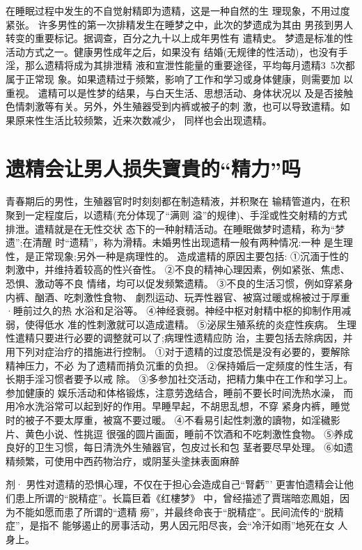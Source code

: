 \documentclass[12pt,UTF8]{ctexbook}
\begin{document}
在睡眠过程中发生的不自觉射精即为遗精，这是一种自然的生
理现象，不用过度紧张。
许多男性的第一次排精发生在睡梦之中，此次的梦遗成为其由
男孩到男人转变的重要标记。据调查，百分之九十以上成年男性有
遣精史。
梦遗是标准的性活动方式之一。健康男性成年之后，如果没有
结婚(无规律的性活动)，也没有手淫，那么遗精将成为其排泄精
液和宣泄性能量的重要途径，平均每月遗精3~5次都属于正常现
象。如果遗精过于频繁，影响了工作和学习或身体健康，则需要加
以重视。
遣精可以是性梦的结果，与白天生活、思想活动、身体状况以
及是否接触色情刺激等有关。另外，外生殖器受到内裤或被子的刺
激，也可以导致遣精。如果原来性生活比较频繁，近来次数减少，
同样也会出现遗精。

\section{遗精会让男人损失寶貴的“精力”吗}

青春期后的男性，生殖器官时时刻刻都在制造精液，并积聚在
输精管道内，在积聚到一定程度后，以遗精(充分体现了“满则
溢”的规律)、手淫或性交射精的方式排泄。遣精就是在无性交状
态下的一种射精活动。在睡眠做梦时遗精，称为“梦遗”;在清醒
时“遗精”，称为滑精。未婚男性出现遗精一般有两种情况:一种
是生理性，是正常现象;另外一种是病理性的。
造成遣精的原因主要包括:
①沉湎于性的刺激中，并维持着较高的性兴奋性。
②不良的精神心理因素，例如紧张、焦虑、恐惧、激动等不良
情绪，均可以促发频繁遗精。
③不良的生活习惯，例如穿紧身内裤、酗酒、吃刺激性食物、
劇烈运动、玩弄性器官、被窩过暖或棉被过于厚重·睡前过久的热
水浴和足浴等。
④神经衰弱。神经中枢对射精中枢的抑制作用减弱，使得低水
准的性刺激就可以造成遣精。
⑤泌尿生殖系统的炎症性疾病。
生理性遣精只要进行必要的调整就可以了;病理性遗精应防
治，主要包括去除病因，并用下列对症治疗的措施进行控制。
①对于遗精的过度恐慌是没有必要的，要解除精神压力，不必
为了遗精而掯负沉重的负担。
②保持婚后一定频度的性生活，有长期手淫习惯者要予以戒
除。
③多参加社交活动，把精力集中在工作和学习上。参加健康的
娱乐活动和体格锻炼，注意劳逸结合，睡前不要长时间洗热水澡，
而用冷水洗浴常可以起到好的作用。早睡早起，不胡思乱想，不穿
紧身内裤，睡觉时的被子不要太厚重，被窩不要过暖。
④不看易引起性刺激的讀物，如淫穢影片、黄色小说、性挑逗
很强的圆片画面，睡前不饮酒和不吃刺激性食物。
⑤养成良好的卫生习惯，每日清洗外生殖器官，包皮过长和包
茎者要尽早处理。
⑥如遗精频繁，可使用中西药物治疗，或阴茎头塗抹表面麻醉

剂·
男性对遗精的恐惧心理，不仅在于担心会造成自己“腎虧”’
更害怕遗精会让他们患上所谓的“脱精症”。长篇巨着《红樓梦》
中，曾经描述了賈瑞暗恋鳳姐，因为不能如愿而患了所谓的“遗精
癆”，并最终命丧于“脱精症”。民间流传的“脱精症”，是指不
能够遏止的房事活动，男人因元阳尽丧，会“冷汗如雨”地死在女
人身上。
\end{document}
